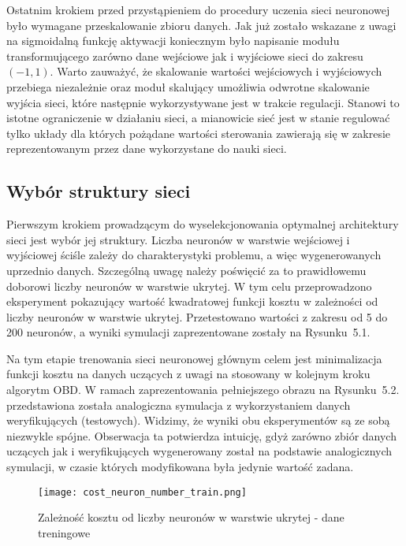 \par Ostatnim krokiem przed przystąpieniem do procedury uczenia sieci neuronowej było wymagane przeskalowanie zbioru danych. Jak już zostało wskazane z uwagi na sigmoidalną funkcję aktywacji koniecznym było napisanie modułu transformującego  zarówno dane wejściowe jak i wyjściowe sieci do zakresu \( (-1,1) \). Warto zauważyć, że skalowanie wartości wejściowych i wyjściowych przebiega niezależnie oraz moduł skalujący umożliwia odwrotne skalowanie wyjścia sieci, które następnie wykorzystywane jest w trakcie regulacji. Stanowi to istotne ograniczenie w działaniu sieci, a mianowicie sieć jest w stanie regulować tylko układy dla których pożądane wartości sterowania zawierają się w zakresie reprezentowanym przez dane wykorzystane do nauki sieci.  

\subsection{Wybór struktury sieci}
Pierwszym krokiem prowadzącym do wyselekcjonowania optymalnej architektury sieci jest wybór jej struktury. Liczba neuronów w warstwie wejściowej i wyjściowej ściśle zależy do charakterystyki problemu, a więc wygenerowanych uprzednio danych. Szczególną uwagę należy poświęcić za to prawidłowemu doborowi liczby neuronów w warstwie ukrytej. W tym celu przeprowadzono eksperyment pokazujący wartość kwadratowej funkcji kosztu w zależności od liczby neuronów w warstwie ukrytej. Przetestowano wartości z zakresu od 5 do 200 neuronów, a wyniki symulacji zaprezentowane zostały na Rysunku~5.1. 
\par Na tym etapie trenowania sieci neuronowej głównym celem jest minimalizacja funkcji kosztu na danych uczących z uwagi na  stosowany w kolejnym kroku algorytm OBD. W ramach zaprezentowania pełniejszego obrazu na Rysunku~5.2. przedstawiona została analogiczna symulacja z wykorzystaniem danych weryfikujących (testowych). Widzimy, że wyniki obu eksperymentów są ze sobą niezwykle spójne. Obserwacja ta potwierdza intuicję, gdyż zarówno zbiór danych uczących jak i weryfikujących wygenerowany został na podstawie analogicznych symulacji, w czasie których modyfikowana była jedynie wartość zadana. 

\begin{figure}[!htb]
  \label{fig:Koszt-liczba-neuronow-treningowe}
  \centering \texttt{[image: cost\_neuron\_number\_train.png]}
  \caption{Zależność kosztu od liczby neuronów w warstwie ukrytej - dane treningowe}
\end{figure}

